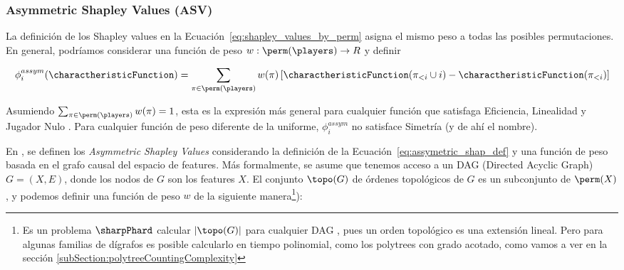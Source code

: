 \subsubsection{Asymmetric Shapley Values (ASV)}

La definición de los Shapley values en la Ecuación~\ref{eq:shapley_values_by_perm} asigna el mismo peso a todas las posibles permutaciones. En general, podríamos considerar una función de peso \(w:\perm(\players) \to R\) y definir

\begin{align}\label{eq:assymetric_shap_def}
	\phi_{i}^{assym}(\charactheristicFunction) = \sum_{\pi \in \perm(\players)} w(\pi) \left[ \charactheristicFunction(\pi_{<i} \cup {i}) - \charactheristicFunction(\pi_{<i}) \right] 
\end{align}

Asumiendo \(\sum_{\pi \in \perm(\players)} w(\pi) = 1\), esta es la expresión más general para cualquier función que satisfaga Eficiencia, Linealidad y Jugador Nulo \cite{frye2019asymmetric}. Para cualquier función de peso diferente de la uniforme, \(\phi_i^{assym}\) no satisface Simetría (y de ahí el nombre).

En \cite{frye2019asymmetric}, se definen los \textit{Asymmetric Shapley Values} considerando la definición de la Ecuación~\ref{eq:assymetric_shap_def} y una función de peso basada en el grafo causal del espacio de features. Más formalmente, se asume que tenemos acceso a un DAG (Directed Acyclic Graph) \(G = (X, E)\), donde los nodos de \(G\) son los features \(X\). El conjunto \(\topo(G)\) de órdenes topológicos de \(G\) es un subconjunto de \(\perm(X)\), y podemos definir una función de peso \(w\) de la siguiente manera\footnote{Es un problema $\sharpPhard$ calcular $|\topo(G)|$  para cualquier DAG \cite{countingLinearExtensions}, pues un orden topológico es una extensión lineal. Pero para algunas familias de dígrafos es posible calcularlo en tiempo polinomial, como los polytrees con grado acotado, como vamos a ver en la sección \ref{subSection:polytreeCountingComplexity} }):

